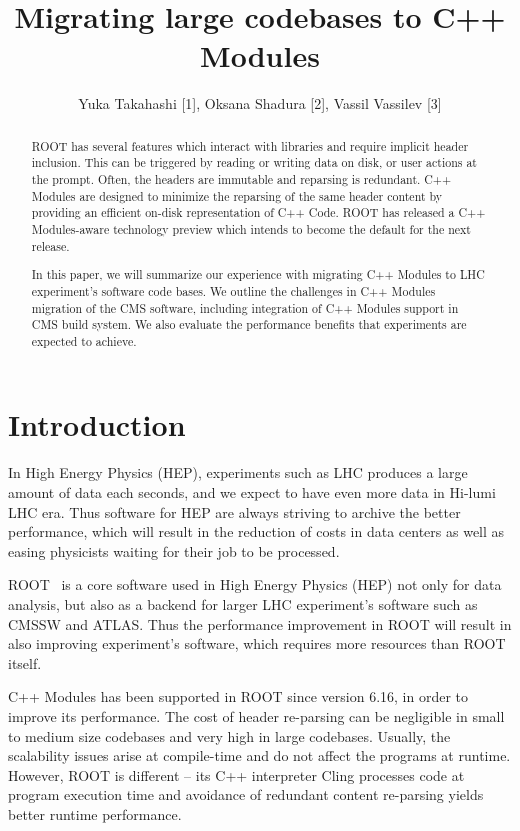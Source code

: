 \documentclass[12pt]{iopart}
\begin{document}
\title{Migrating large codebases to C++ Modules}

\author{Yuka Takahashi [1], Oksana Shadura [2], Vassil Vassilev [3]}
\address{[1] University of Tokyo, [2] University of Nebraska-Lincoln, [3] Princeton University}

\begin{abstract}
ROOT has several features which interact with libraries and require implicit header inclusion. This can be triggered by reading or writing data on disk, or user actions at the prompt. Often, the headers are immutable and reparsing is redundant. C++ Modules are designed to minimize the reparsing of the same header content by providing an efficient on-disk representation of C++ Code. ROOT has released a C++ Modules-aware technology preview which intends to become the default for the next release.

In this paper, we will summarize our experience with migrating C++ Modules to LHC experiment's software code bases. We outline the challenges in C++ Modules migration of the CMS software, including integration of C++ Modules support in CMS build system. We also evaluate the performance benefits that experiments are expected to achieve.
\end{abstract}

\section{Introduction}
\label{intro}

In High Energy Physics (HEP), experiments such as LHC \cite{lhc} produces a large amount of data each seconds, and we expect to have even more data in Hi-lumi LHC \cite{hilumi} era. Thus software for HEP are always striving to archive the better performance, which will result in the reduction of costs in data centers as well as easing physicists waiting for their job to be processed.

ROOT~\cite{root} is a core software used in High Energy Physics (HEP) not only for data analysis, but also as a backend for larger LHC experiment's software such as CMSSW and ATLAS. Thus the performance improvement in ROOT will result in also improving experiment's software, which requires more resources than ROOT itself.

C++ Modules \cite{vassil-paper} has been supported in ROOT since version 6.16, in order to improve its performance. The cost of header re-parsing can be negligible in small to medium size codebases and very high in large codebases. Usually, the scalability issues arise at compile-time and do not affect the programs at runtime. However, ROOT is different -- its C++ interpreter Cling processes code at program execution time and avoidance of redundant content re-parsing yields better runtime performance.
\end{document}
